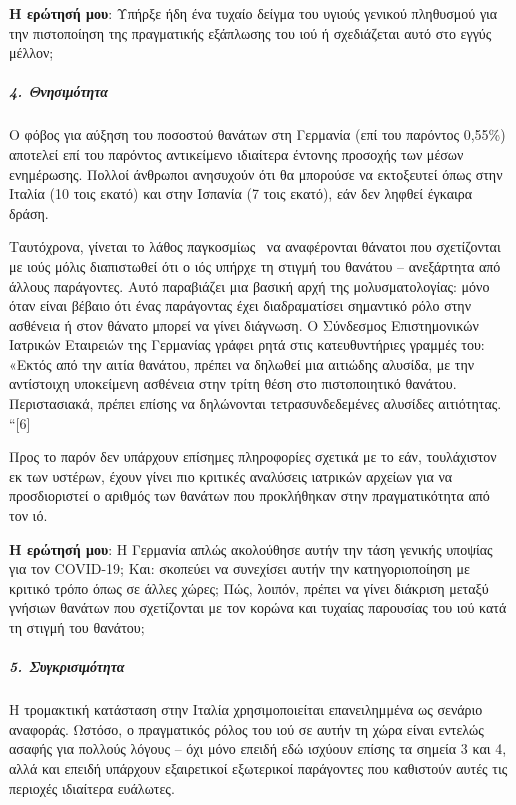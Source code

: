 \textbf{Η ερώτησή μου}: Υπήρξε ήδη ένα τυχαίο δείγμα του υγιούς γενικού
πληθυσμού για την πιστοποίηση της πραγματικής εξάπλωσης του ιού ή
σχεδιάζεται αυτό στο εγγύς μέλλον;

\hypertarget{4-ux3b8ux3bdux3b7ux3c3ux3b9ux3bcux3ccux3c4ux3b7ux3c4ux3b1}{%
\subparagraph{\texorpdfstring{\textbf{4.
Θνησιμότητα}}{4. Θνησιμότητα}}\label{4-ux3b8ux3bdux3b7ux3c3ux3b9ux3bcux3ccux3c4ux3b7ux3c4ux3b1}}

Ο φόβος για αύξηση του ποσοστού θανάτων στη Γερμανία (επί του παρόντος
0,55\%) αποτελεί επί του παρόντος αντικείμενο ιδιαίτερα έντονης προσοχής
των μέσων ενημέρωσης. Πολλοί άνθρωποι ανησυχούν ότι θα μπορούσε να
εκτοξευτεί όπως στην Ιταλία (10 τοις εκατό) και στην Ισπανία (7 τοις
εκατό), εάν δεν ληφθεί έγκαιρα δράση.

Ταυτόχρονα, γίνεται το λάθος παγκοσμίως~ να αναφέρονται θάνατοι που
σχετίζονται με ιούς μόλις διαπιστωθεί ότι ο ιός υπήρχε τη στιγμή του
θανάτου -- ανεξάρτητα από άλλους παράγοντες. Αυτό παραβιάζει μια βασική
αρχή της μολυσματολογίας: μόνο όταν είναι βέβαιο ότι ένας παράγοντας
έχει διαδραματίσει σημαντικό ρόλο στην ασθένεια ή στον θάνατο μπορεί να
γίνει διάγνωση. Ο Σύνδεσμος Επιστημονικών Ιατρικών Εταιρειών της
Γερμανίας γράφει ρητά στις κατευθυντήριες γραμμές του: «Εκτός από την
αιτία θανάτου, πρέπει να δηλωθεί μια αιτιώδης αλυσίδα, με την αντίστοιχη
υποκείμενη ασθένεια στην τρίτη θέση στο πιστοποιητικό θανάτου.
Περιστασιακά, πρέπει επίσης να δηλώνονται τετρασυνδεδεμένες αλυσίδες
αιτιότητας. ``{[}6{]}

Προς το παρόν δεν υπάρχουν επίσημες πληροφορίες σχετικά με το εάν,
τουλάχιστον εκ των υστέρων, έχουν γίνει πιο κριτικές αναλύσεις ιατρικών
αρχείων για να προσδιοριστεί ο αριθμός των θανάτων που προκλήθηκαν στην
πραγματικότητα από τον ιό.

\textbf{Η ερώτησή μου}: Η Γερμανία απλώς ακολούθησε αυτήν την τάση
γενικής υποψίας για τον COVID-19; Και: σκοπεύει να συνεχίσει αυτήν την
κατηγοριοποίηση με κριτικό τρόπο όπως σε άλλες χώρες; Πώς, λοιπόν,
πρέπει να γίνει διάκριση μεταξύ γνήσιων θανάτων που σχετίζονται με τον
κορώνα και τυχαίας παρουσίας του ιού κατά τη στιγμή του θανάτου;

\hypertarget{5-ux3c3ux3c5ux3b3ux3baux3c1ux3b9ux3c3ux3b9ux3bcux3ccux3c4ux3b7ux3c4ux3b1}{%
\subparagraph{\texorpdfstring{\textbf{5.
Συγκρισιμότητα}}{5. Συγκρισιμότητα}}\label{5-ux3c3ux3c5ux3b3ux3baux3c1ux3b9ux3c3ux3b9ux3bcux3ccux3c4ux3b7ux3c4ux3b1}}

Η τρομακτική κατάσταση στην Ιταλία χρησιμοποιείται επανειλημμένα ως
σενάριο αναφοράς. Ωστόσο, ο πραγματικός ρόλος του ιού σε αυτήν τη χώρα
είναι εντελώς ασαφής για πολλούς λόγους -- όχι μόνο επειδή εδώ ισχύουν
επίσης τα σημεία 3 και 4, αλλά και επειδή υπάρχουν εξαιρετικοί
εξωτερικοί παράγοντες που καθιστούν αυτές τις περιοχές ιδιαίτερα
ευάλωτες.

